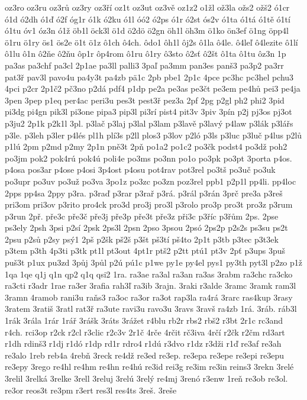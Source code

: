{oz3ro
oz3ru
oz3rů
oz3ry
oz3ří
oz1t
oz3ut
oz3vě
oz1z2
o1žl
ož3la
ožs2
ožš2
ó1cr
ó1d
ó2dh
ó1ď
ó2f
óg1r
ó1k
ó2ku
ó1l
óó2
ó2ps
ó1r
ó2st
ós2v
ó1ta
ó1tá
ó1tě
ó1tí
ó1tu
óv1
óz3n
ó1ž
öb1l
öck3l
ö1d
ö2dö
ö2gn
öh1l
öh3m
ö1ko
ön3ef
ö1ng
öpp4l
ö1ru
ö1ry
ös1
ös2e
ö1t
ö1z
ô1ch
ô4ch.
ôdo1
ôh1l
ôj2s
ô1la
ô4le.
ô4leľ
ô4lezite
ô1lí
ô1lu
ô1n
ô2ňe
ô2ňu
ôp1r
ôp4rom
ô1ru
ô1ry
ô3sto
ô2sť
ô2št
ô1ta
ô1tu
ôz3n
1p
pa3as
pa3chf
pa3cl
2p1ae
pa3ll
palli3
3paľ
pa3mm
pan3es
panš3
pa3p2
pa3rr
pat3ř
pav3l
pavo4u
pa4y3t
pa4zb
pä1c
2pb
pbe1
2p1c
4pce
pc3hc
pc3hel
pchu3
4pci
p2cr
2p1č2
pč3no
p2dá
pdf4
p1dp
pe2a
pe3as
pe3čt
pe3em
pe4hů
pei3
pe4ja
3pen
3pep
p1eq
per4ac
peri3u
pes3t
pest3ř
pez3a
2pf
2pg
p2gl
ph2
phi2
3pid
pi3dg
pi4gn
pik3l
pi3one
pipa3
pip3l
pi3rí
pist4
pit3v
3piv
3pín
p2j
pj3os
pj3ot
p3ju2
2p1k
p2k1l
3pl.
p3lač
p3laj
p3lal
p3lam
p3lavě
p3lavý
p4law
p3lák
p3lářs
p3le.
p3leh
p3ler
p4lés
pl1h
plí3s
p2ll
plos3
p3lov
p2ló
p3ls
p3luc
p3luč
p4lus
p2lů
p1lú
2pm
p2md
p2my
2p1n
pně3t
2pň
po1a2
po1c2
po3čk
podst4
po3dž
poh2
po3jm
pok2
pok4rú
pok4ú
poli4e
po3ms
po3nn
po1o
po3pk
po3pt
3porta
p4os.
p4osa
pos3ar
p4ose
p4osi
3p4ost
p4osu
pot4rav
pot3rel
po3tš
po3uč
po3uk
po3upr
po3uv
po3už
po3va
3po1z
po3zc
po3zn
poz3rel
ppb1
p2p1l
pp4li.
pp4loc
2pps
pp4sa
2ppy
p3ra.
p3raď
p3rar
p3rař
p3rá.
p3rál
p3rán
3prč
pre3a
p3reš
pri3om
pri3ov
p3rito
pro4ck
pro3d
pro3j
pro3l
p3rolo
pro3p
pro3t
pro3z
p3rum
p3run
2př.
pře3c
pře3č
pře3j
pře3p
pře3t
pře3z
při3c
p3říc
p3řům
2ps.
2pse
ps3ely
2psh
3psi
p2sí
2psk
2ps3l
2psn
2pso
3psou
2psó
2ps2p
p2s2s
ps3su
ps2t
2psu
p2sů
p2sy
psý1
2pš
p2šk
pš2š
p3št
pš3tí
pš4to
2p1t
p3tb
p3tec
p3t3ek
p3tem
p3th
4p3ti
p3tk
pt1l
pt3out
4pt1r
ptš2
p2tt
ptú1
pt3v
2pť
p3ups
3puš
puš3t
p1ux
pu3zd
3půj
3půl
p2ú
pú1c
p1we
py1e
py4el
pys1
py3th
pyt3l
p2zo
p1ž
1qa
1qe
q1j
q1n
qp2
q1q
qsi2
1ra.
ra3ae
ra3al
ra3an
ra3as
3rabm
ra3chc
ra3cko
ra3cti
r3adr
1rae
ra3er
3rafia
rah3ľ
ra3ib
3rajn.
3raki
r3alde
3ramc
3ramk
ram3l
3ramn
4ramob
rani3u
raňs3
ra3oc
ra3or
ra3ot
rap3la
ra4rá
3rarc
ras4kup
3rasy
3ratem
3ratiš
3ratl
rat3ř
ra3ute
ravi3u
ravo3u
3ravs
3ravš
ra4zb
1rá.
3ráb.
ráb3l
1rák
3rála
1rár
1rář
3rášk
3ráts
3rážet
r4blu
rb2r
rbs2
rbš2
r3bt
2r1c
rc3and
r4ch.
rci3op
r2ck
r2cl
r3clic
r2c3v
2r1č
4rče
4rčit
rč3iva
4rčí
r2čk
r2čm
rd3art
r1dh
rdinš3
r1dj
r1dó
r1dp
rd1r
rdro4
r1dú
r3dvo
r1dz
r3dži
r1ď
re3af
re3ah
re3alo
1reb
reb4a
4rebň
3reck
re4dž
re3ed
re3ep.
re3epa
re3epe
re3epi
re3epu
re3epy
3rego
re4hl
re4hm
re4hn
re4hú
re3id
rei3g
re3im
re3in
reins3
3rekn
3relé
3relil
3relká
3relke
3rell
3reluj
3relú
3relý
re4mj
3renó
r3enw
1reň
re3ob
re3ol.
re3or
reos3t
re3pm
r3ert
res3l
res4ts
3reš.
3reše
}
